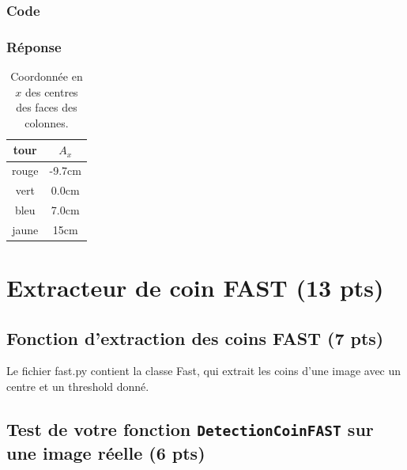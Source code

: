 \documentclass[12pt]{article}
\begin{document}
\subsubsection{Code}
\subsubsection{Réponse}

\begin{table}[h]
\caption{Coordonnée en $x$ des centres des faces des colonnes.}
\label{TableX}
\begin{center}
\begin{tabular}{|c|c|}
\hline
 tour   &  $A_x$ \\
\hline
 rouge  &  -9.7cm     \\
 vert   &  0.0cm   \\
 bleu   &  7.0cm    \\
 jaune  &  15cm     \\
\hline
\end{tabular}
\end{center}
\end{table}


\newpage
\section{Extracteur de coin FAST (13 pts)}
 \label{SectionFAST}

\subsection{Fonction d'extraction des coins FAST (7 pts)}
Le fichier fast.py contient la classe Fast, qui extrait les coins d'une image avec un centre et un threshold donn\'e.
\subsection{Test de votre fonction \texttt{DetectionCoinFAST} sur une image réelle (6 pts)}
\end{document}
